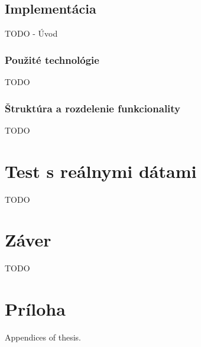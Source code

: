 \documentclass[
  printed, %
  table,   %
  lof,     %
  lot,     %
]{fithesis3}
\begin{document}
\section{Implementácia}
TODO - Úvod

\subsection{Použité technológie}
TODO

\subsection{Štruktúra a rozdelenie funkcionality}
TODO

\chapter{Test s reálnymi dátami}
\label{ch:data}
TODO

\chapter{Záver}
TODO

\makeatletter\thesis@blocks@clear\makeatother
{} %
\printindex

\appendix %
\chapter{Príloha}
Appendices of thesis.
\end{document}
